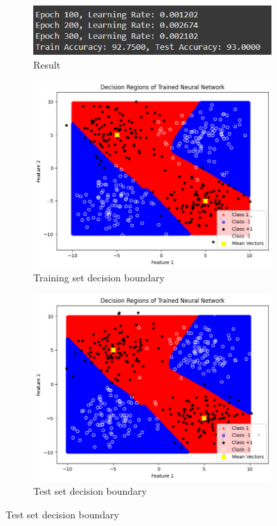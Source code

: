 \documentclass[a4paper,12pt]{article}
\begin{document}
\begin{figure}[H]
    \centering
    \captionsetup[subfigure]{list=true} %

    \begin{subfigure}{0.5\textwidth}
        \centering
        \includegraphics[width=\textwidth]{3.4_r.png}
        \caption{Result}
    \end{subfigure}
    \begin{subfigure}{0.45\textwidth}
        \centering
        \includegraphics[width=\textwidth]{3.4_Train.png}
        \caption{Training set decision boundary}
    \end{subfigure}

    \begin{subfigure}{0.45\textwidth}
        \centering
        \includegraphics[width=\textwidth]{3.4_Test.png}
        \caption{Test set decision boundary}
    \end{subfigure}


\end{figure}
\end{document}
